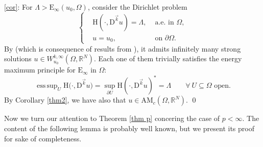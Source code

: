\documentclass[a4paper,11pt]{article}
\numberwithin{equation}{section}
\newcommand{\numberset}{\mathbb}
\newcommand{\Om}{\Omega}
\newcommand{\R}{\numberset{R}}
\newcommand{\rom}{\mathrm}
\DeclareMathOperator*{\esssup}{ess\,sup}
\theoremstyle{definition}
\begin{document}
 \ref{cor}: For $\Lambda>\mathrm E_\infty(u_0,\Om)$, consider the Dirichlet problem
\begin{equation}\nonumber
\left\{
\begin{aligned}
&\rom H(\cdot, \rom D^{\vec{k}}u)=\Lambda, &\text{ a.e. in }\Om,
\\
&u=u_0, & \text{ on }\partial \Omega.
\end{aligned}
\right.
\end{equation}
By \cite[Proposition 1]{K5} (which is consequence of results from \cite{D-M}), it admits infinitely many strong solutions $u\in W^{k,\infty}_{u_0}(\Om,\R^N)$. Each one of them trivially satisfies the energy maximum principle for $\mathrm E_\infty$ in $\Om$:
$$
\esssup_U \rom{H}\big (\cdot,\mathrm D^{\vec{k}}u \big)=\sup_{\partial U}\rom{H}(\cdot,\mathrm D ^{\vec{k}}u)^*=\Lambda\qquad\forall\  U\subseteq\Om \mbox{ open}.
$$
By Corollary \ref{thm2}, we have also that $u\in \mathrm{AM}_c(\Om,\R^N)$. \qed

\medskip

Now we turn our attention to Theorem \ref{thm p} concering the case of $p<\infty$. The content of the following lemma is probably well known, but we present its proof for sake of completeness.
\end{document}
